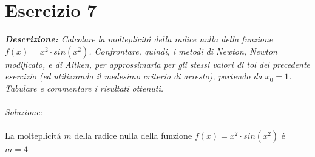 \section{Esercizio 7}

\textit{\textbf{Descrizione:} Calcolare la molteplicit\'a della radice nulla della funzione $f(x) = x^{2} \cdot sin(x^{2})$. Confrontare, quindi, i metodi di Newton, Newton modificato, e di Aitken, per approssimarla per gli stessi valori di tol del precedente esercizio (ed utilizzando il medesimo criterio di arresto), partendo da $x_{0}=1$. Tabulare e commentare i risultati ottenuti.}\\~\\
\emph{Soluzione:}\\~\\
La molteplicit\'a $m$ della radice nulla della funzione $f(x) = x^{2} \cdot sin(x^{2})$  \'e $m=4$
\\~\\

